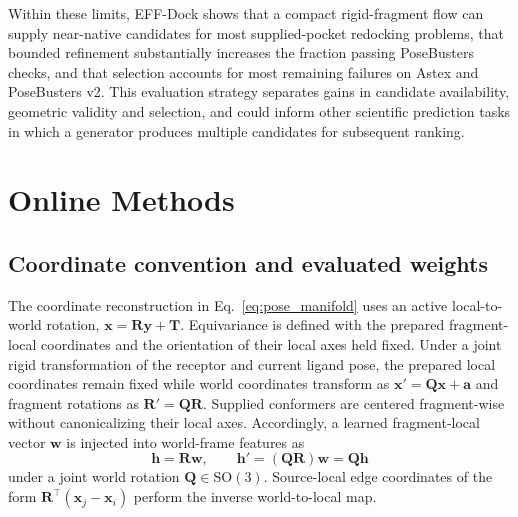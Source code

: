 \documentclass{article}
\newcommand{\method}{EFF-Dock\xspace}
\newcommand{\SO}{\mathrm{SO}}
\begin{document}
Within these limits, \method shows that a compact rigid-fragment flow can supply near-native candidates for most supplied-pocket redocking problems, that bounded refinement substantially increases the fraction passing PoseBusters checks, and that selection accounts for most remaining failures on Astex and PoseBusters v2. This evaluation strategy separates gains in candidate availability, geometric validity and selection, and could inform other scientific prediction tasks in which a generator produces multiple candidates for subsequent ranking.

\section{Online Methods}\label{sec:online-methods}
\label{sec:method}

\subsection{Coordinate convention and evaluated weights}
\label{sec:orientation_convention}

The coordinate reconstruction in Eq.~\eqref{eq:pose_manifold} uses an active local-to-world rotation, \(\mathbf x=\mathbf R\mathbf y+\mathbf T\).
Equivariance is defined with the prepared fragment-local coordinates and the orientation of their local axes held fixed. Under a joint rigid transformation of the receptor and current ligand pose, the prepared local coordinates remain fixed while world coordinates transform as \(\mathbf x'=\mathbf Q\mathbf x+\mathbf a\) and fragment rotations as \(\mathbf R'=\mathbf Q\mathbf R\). Supplied conformers are centered fragment-wise without canonicalizing their local axes.
Accordingly, a learned fragment-local vector \(\mathbf w\) is injected into world-frame features as
\begin{equation}
    \mathbf h=\mathbf R\mathbf w,
    \qquad
    \mathbf h'=(\mathbf Q\mathbf R)\mathbf w=\mathbf Q\mathbf h
    \label{eq:orientation_injection}
\end{equation}
under a joint world rotation \(\mathbf Q\in\SO(3)\).
Source-local edge coordinates of the form \(\mathbf R^\top(\mathbf x_j-\mathbf x_i)\) perform the inverse world-to-local map.
\end{document}
